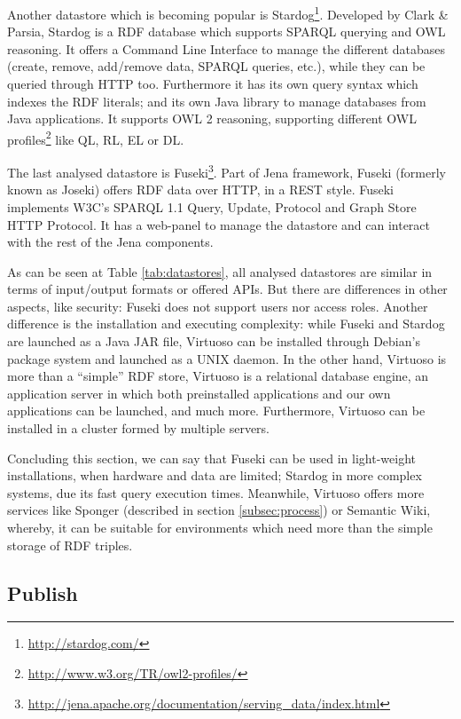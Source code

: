 Another datastore which is becoming popular is Stardog\footnote{\url{http://stardog.com/}}. Developed by Clark \& Parsia, Stardog is a RDF database which supports SPARQL querying and OWL reasoning. It offers a Command Line Interface to manage the different databases (create, remove, add/remove data, SPARQL queries, etc.), while they can be queried through HTTP too. Furthermore it has its own query syntax which indexes the RDF literals; and its own Java library to manage databases from Java applications. It supports OWL 2 reasoning, supporting different OWL profiles\footnote{\url{http://www.w3.org/TR/owl2-profiles/}} like QL, RL, EL or DL.

The last analysed datastore is Fuseki\footnote{\url{http://jena.apache.org/documentation/serving_data/index.html}}. Part of Jena framework, Fuseki (formerly known as Joseki) offers RDF data over HTTP, in a REST style. Fuseki implements W3C's SPARQL 1.1 Query, Update, Protocol and Graph Store HTTP Protocol. It has a web-panel to manage the datastore and can interact with the rest of the Jena components.

As can be seen at Table \ref{tab:datastores}, all analysed datastores are similar in terms of input/output formats or offered APIs. But there are differences in other aspects, like security: Fuseki does not support users nor access roles. Another difference is the installation and executing complexity: while Fuseki and Stardog are launched as a Java JAR file, Virtuoso can be installed through Debian's package system and launched as a UNIX daemon. In the other hand, Virtuoso is more than a ``simple'' RDF store, Virtuoso is a relational database engine, an application server in which both preinstalled applications and our own applications can be launched, and much more. Furthermore, Virtuoso can be installed in a cluster formed by multiple servers.

Concluding this section, we can say that Fuseki can be used in light-weight installations, when hardware and data are limited; Stardog in more complex systems, due its fast query execution times. Meanwhile, Virtuoso offers more services like Sponger (described in section \ref{subsec:process}) or Semantic Wiki, whereby, it can be suitable for environments which need more than the simple storage of RDF triples.


\subsection{Publish}\label{subsec:publish}

